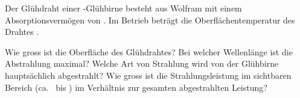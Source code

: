 Der Glühdraht einer \PdO-Glühbirne besteht aus Wolfram mit einem Absorptionsvermögen von \eWO. Im Betrieb beträgt die Oberflächentemperatur des Drahtes \tDO.
\begin{abcliste}
\abc Wie gross ist die Oberfläche des Glühdrahtes?
\abc Bei welcher Wellenlänge ist die Abstrahlung maximal? Welche Art von Strahlung wird von der Glühbirne hauptsächlich abgestrahlt?
\abc Wie gross ist die Strahlungsleistung im sichtbaren Bereich (ca. \lAO\ bis \lEO) im Verhältnis zur gesamten abgestrahlten Leistung?
\end{abcliste}

